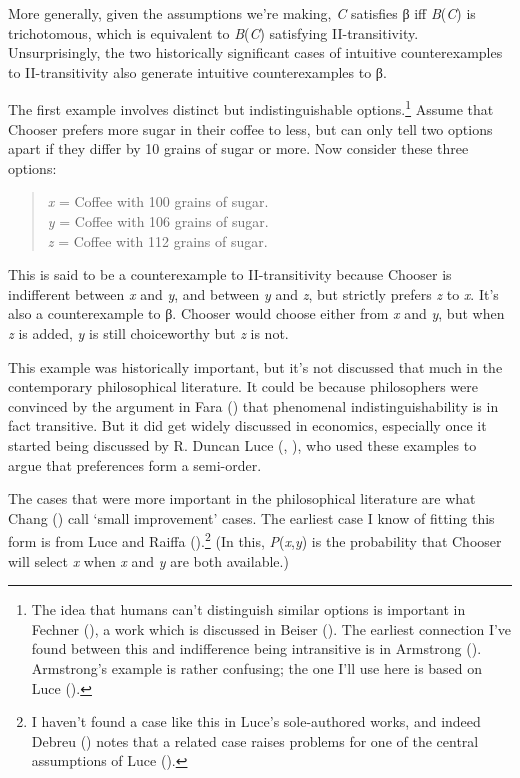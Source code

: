 \documentclass[
  11pt,
  letterpaper,
  DIV=11,
  numbers=noendperiod,
  twoside]{scrartcl}
\begin{document}
More generally, given the assumptions we're making, \emph{C} satisfies β
iff \emph{B}(\emph{C}) is trichotomous, which is equivalent to
\emph{B}(\emph{C}) satisfying II-transitivity. Unsurprisingly, the two
historically significant cases of intuitive counterexamples to
II-transitivity also generate intuitive counterexamples to β.

The first example involves distinct but indistinguishable
options.\footnote{The idea that humans can't distinguish similar options
  is important in Fechner (), a work
  which is discussed in Beiser (). The
  earliest connection I've found between this and indifference being
  intransitive is in Armstrong ().
  Armstrong's example is rather confusing; the one I'll use here is
  based on Luce ().} Assume that Chooser
prefers more sugar in their coffee to less, but can only tell two
options apart if they differ by 10 grains of sugar or more. Now consider
these three options:

\begin{quote}
\emph{x} = Coffee with 100 grains of sugar.\\
\emph{y} = Coffee with 106 grains of sugar.\\
\emph{z} = Coffee with 112 grains of sugar.
\end{quote}

This is said to be a counterexample to II-transitivity because Chooser
is indifferent between \emph{x} and \emph{y}, and between \emph{y} and
\emph{z}, but strictly prefers \emph{z} to \emph{x}. It's also a
counterexample to β. Chooser would choose either from \emph{x} and
\emph{y}, but when \emph{z} is added, \emph{y} is still choiceworthy but
\emph{z} is not.

This example was historically important, but it's not discussed that
much in the contemporary philosophical literature. It could be because
philosophers were convinced by the argument in Fara
() that phenomenal indistinguishability is
in fact transitive. But it did get widely discussed in economics,
especially once it started being discussed by R. Duncan Luce
(, ), who used
these examples to argue that preferences form a semi-order.

The cases that were more important in the philosophical literature are
what Chang () call `small improvement'
cases. The earliest case I know of fitting this form is from Luce and
Raiffa ().\footnote{I haven't found a
  case like this in Luce's sole-authored works, and indeed Debreu
  () notes that a related case raises
  problems for one of the central assumptions of Luce
  ().} (In this,
\emph{P}(\emph{x},\emph{y}) is the probability that Chooser will select
\emph{x} when \emph{x} and \emph{y} are both available.)
\end{document}
